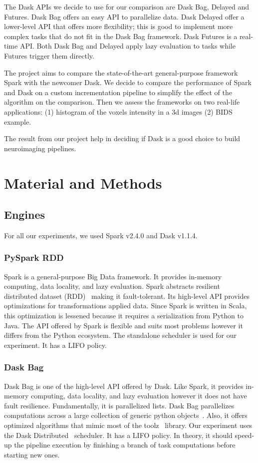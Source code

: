 \documentclass[conference]{IEEEtran}
\begin{document}
The Dask APIs we decide to use for our comparison are Dask Bag, Delayed and Futures.
Dask Bag offers an easy API to parallelize data. Dask Delayed offer a lower-level API
that offers more flexibility; this is good to implement more complex tasks that do
not fit in the Dask Bag framework. Dask Futures is a real-time API. Both Dask Bag and
Delayed apply lazy evaluation to tasks while Futures trigger them directly.

The project aims to compare the state-of-the-art general-purpose framework Spark with
the newcomer Dask. We decide to compare the performance of Spark and Dask on a custom
incrementation pipeline to simplify the effect of the algorithm on the comparison.
Then we assess the frameworks on two real-life applications: (1) histogram of the
voxels intensity in a 3d images (2) BIDS example.

The result from our project help in deciding if Dask is a good choice to build
neuroimaging pipelines.


\section{Material and Methods}

\subsection{Engines}
For all our experiments, we used Spark v2.4.0 and Dask v1.1.4.

\subsubsection{PySpark RDD~\cite{spark-rdd}} Spark is a general-purpose Big Data
framework. It provides in-memory computing, data locality, and lazy evaluation. Spark
abstracts resilient distributed dataset (RDD)~\cite{RDD} making it fault-tolerant.
Its high-level API provides optimizations for transformations applied data. Since
Spark is written in Scala, this optimization is lessened because it requires a
serialization from Python to Java. The API offered by Spark is flexible and suits
most problems however it differs from the Python ecosystem. The standalone scheduler
is used for our experiment. It has a LIFO policy.

\subsubsection{Dask Bag~\cite{dask-bag}} Dask Bag is one of the high-level API
offered by Dask. Like Spark, it provides in-memory computing, data locality, and lazy
evaluation however it does not have fault resilience. Fundamentally, it is
parallelized lists. Dask Bag parallelizes computations across a large collection of
generic python objects~\cite{dask-bag}. Also, it offers optimized algorithms that
mimic most of the toolz~\cite{toolz} library. Our experiment uses the Dask
Distributed~\cite{dask-distributed} scheduler. It has a LIFO policy. In theory, it
should speed-up the pipeline execution by finishing a branch of task computations
before starting new ones.
\end{document}
